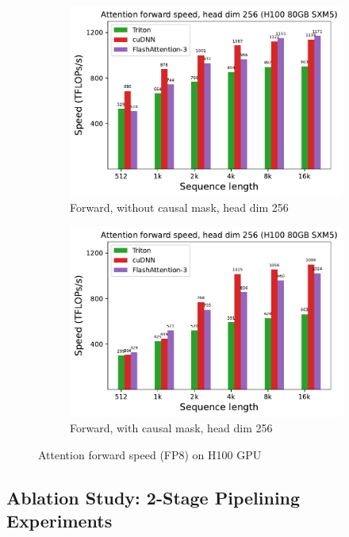 \begin{figure}[ht]
  \centering
  \begin{subfigure}{.5\textwidth}
    \centering
    \includegraphics[width=.95\linewidth]{figs/flash3_h100_fp8_causal_False_hdim_256_fwd_speed.pdf}
    \caption{Forward, without causal mask, head dim 256}
  \end{subfigure}%
  \begin{subfigure}{.5\textwidth}
    \centering
    \includegraphics[width=.95\linewidth]{figs/flash3_h100_fp8_causal_True_hdim_256_fwd_speed.pdf}
    \caption{Forward, with causal mask, head dim 256}
  \end{subfigure}
  \caption{Attention forward speed (FP8) on H100 GPU}
  \label{fig:benchmark_attn_fp8}
\end{figure}

\subsection{Ablation Study: 2-Stage Pipelining Experiments}
\label{sec:2-stage-pipelining-experiments}

